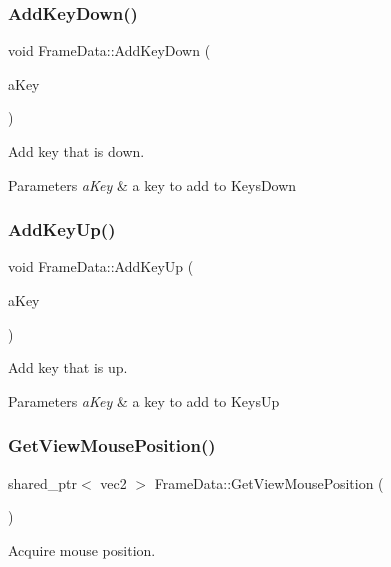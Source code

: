 \subsubsection{AddKeyDown()}
{\footnotesize\ttfamily void Frame\+Data\+::\+Add\+Key\+Down (\begin{DoxyParamCaption}\item[{S\+D\+L\+\_\+\+Keycode}]{a\+Key }\end{DoxyParamCaption})}



Add key that is down. 


\begin{DoxyParams}{Parameters}
{\em a\+Key} & a key to add to Keys\+Down \\
\hline
\end{DoxyParams}
\mbox{\label{class_frame_data_aed73d3ac1f6157d5af6c528bde9ac682}} 
\subsubsection{AddKeyUp()}
{\footnotesize\ttfamily void Frame\+Data\+::\+Add\+Key\+Up (\begin{DoxyParamCaption}\item[{S\+D\+L\+\_\+\+Keycode}]{a\+Key }\end{DoxyParamCaption})}



Add key that is up. 


\begin{DoxyParams}{Parameters}
{\em a\+Key} & a key to add to Keys\+Up \\
\hline
\end{DoxyParams}
\mbox{\label{class_frame_data_a889c857cad48acc4c753032bc521d242}} 
\subsubsection{GetViewMousePosition()}
{\footnotesize\ttfamily shared\+\_\+ptr$<$ vec2 $>$ Frame\+Data\+::\+Get\+View\+Mouse\+Position (\begin{DoxyParamCaption}{ }\end{DoxyParamCaption})}



Acquire mouse position. 

